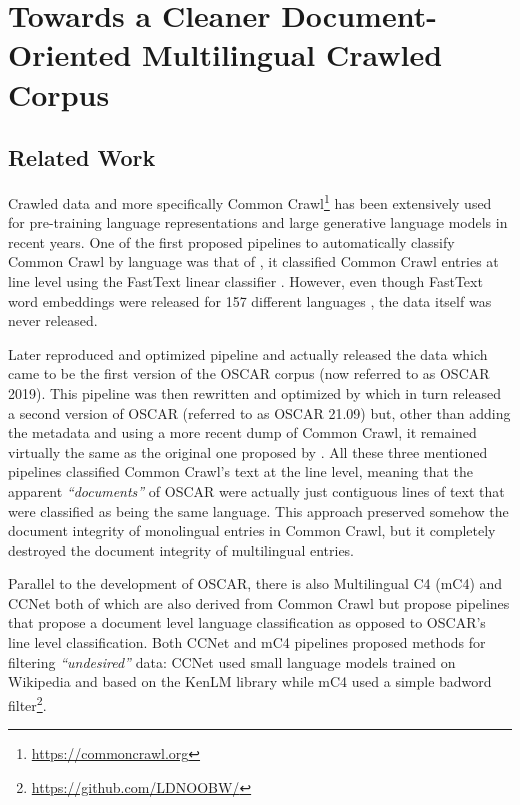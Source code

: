\chapter{Towards a Cleaner Document-Oriented Multilingual Crawled Corpus}

\section{Related Work}

Crawled data and more specifically Common Crawl\footnote{\url{https://commoncrawl.org}} has been extensively used for pre-training language representations and large generative language models in recent years. One of the first proposed pipelines to automatically classify Common Crawl by language was that of , it classified Common Crawl entries at line level using the FastText linear classifier \cite{joulin-etal-2016-fasttext,joulin-etal-2017-bag}. However, even though FastText word embeddings were released for 157 different languages \cite{grave-etal-2018-learning}, the data itself was never released.

Later  reproduced and optimized  pipeline and actually released the data which came to be the first version of the OSCAR corpus (now referred to as OSCAR 2019). This pipeline was then rewritten and optimized by  which in turn released a second version of OSCAR (referred to as OSCAR 21.09) but, other than adding the metadata and using a more recent dump of Common Crawl, it remained virtually the same as the original one proposed by . All these three mentioned pipelines \cite{grave-etal-2018-learning,ortiz-suarez-etal-2019-asynchronous,abadji-etal-2021-ungoliant} classified Common Crawl's text at the line level, meaning that the apparent \emph{``documents''} of OSCAR were actually just contiguous lines of text that were classified as being the same language. This approach preserved somehow the document integrity of monolingual entries in Common Crawl, but it completely destroyed the document integrity of multilingual entries.

Parallel to the development of OSCAR, there is also Multilingual C4 (mC4) \cite{xue-etal-2021-mt5} and CCNet \cite{wenzek-etal-2020-ccnet} both of which are also derived from Common Crawl but propose pipelines that propose a document level language classification as opposed to OSCAR's line level classification. Both CCNet and mC4 pipelines proposed methods for filtering \emph{``undesired''} data: CCNet used small language models trained on Wikipedia and based on the KenLM library \cite{heafield-2011-kenlm} while mC4 used a simple badword filter\footnote{\url{https://github.com/LDNOOBW/}}.

